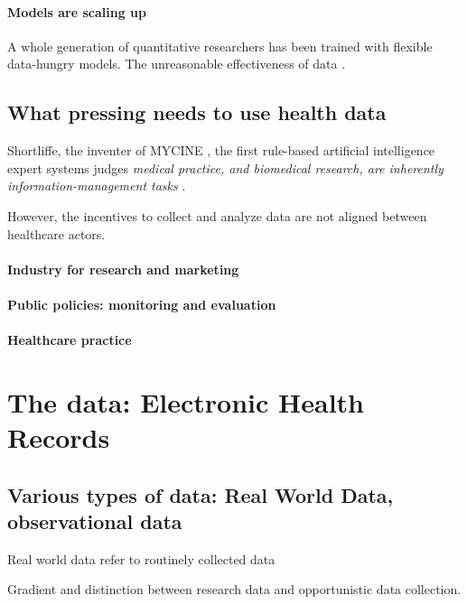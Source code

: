 \documentclass{report}
\begin{document}
\paragraph{Models are scaling up}
A whole generation of quantitative researchers has been trained with flexible
data-hungry models. The unreasonable effectiveness of data \citep{halevy2009unreasonable}.

\subsection{What pressing needs to use health data}

Shortliffe, the inventer of MYCINE \citep{shortliffe1974mycin}, the first
rule-based artificial intelligence expert systems judges \textit{medical
  practice, and biomedical research, are inherently information-management tasks}
\citep{patel2009coming}.

However, the incentives to collect and analyze data are not aligned between
healthcare actors.

\paragraph{Industry for research and marketing}

\paragraph{Public policies: monitoring and evaluation}

\paragraph{Healthcare practice}

\section{The data: Electronic Health Records}\label{sec:intro:data}

\subsection{Various types of data: Real World Data, observational data}\label{subsec:intro:real_world_data}

Real world data refer to routinely collected data

Gradient and distinction between research data and opportunistic data collection.
\end{document}
